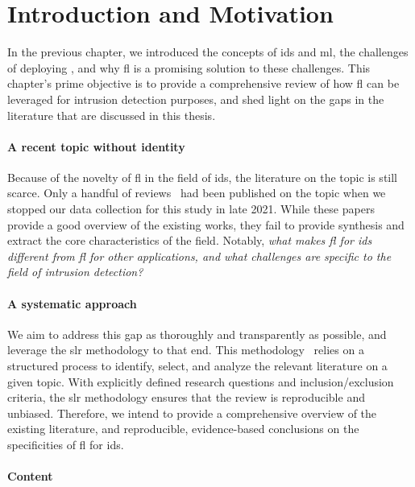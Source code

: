 \section{Introduction and Motivation\label{sec:sota.intro}}

In the previous chapter, we introduced the concepts of \acrfull{ids} and \acrfull{ml}, the challenges of deploying , and why \acrfull{fl} is a promising solution to these challenges. 
This chapter's prime objective is to provide a comprehensive review of how \gls{fl} can be leveraged for intrusion detection purposes, and shed light on the gaps in the literature that are discussed in this thesis.

\paragraph{A recent topic without identity}

Because of the novelty of \gls{fl} in the field of \gls{ids}, the literature on the topic is still scarce.
Only a handful of reviews~\cite{alazab_FederatedLearningCybersecurity_2021,agrawal_FederatedLearningIntrusion_2021,campos_EvaluatingFederatedLearning_2022} had been published on the topic when we stopped our data collection for this study in late 2021.
While these papers provide a good overview of the existing works, they fail to provide synthesis and extract the core characteristics of the field.
Notably, \emph{what makes \gls{fl} for \gls{ids} different from \gls{fl} for other applications, and what challenges are specific to the field of intrusion detection?}


\paragraph{A systematic approach}

We aim to address this gap as thoroughly and transparently as possible, and leverage the \acrfull{slr} methodology to that end.
This methodology~\cite{kitchenham_Guidelinesperformingsystematic_2007} relies on a structured process to identify, select, and analyze the relevant literature on a given topic.
With explicitly defined research questions and inclusion/exclusion criteria, the \gls{slr} methodology ensures that the review is reproducible and unbiased.
Therefore, we intend to provide a comprehensive overview of the existing literature, and reproducible, evidence-based conclusions on the specificities of \gls{fl} for \gls{ids}.

\paragraph{Content}

